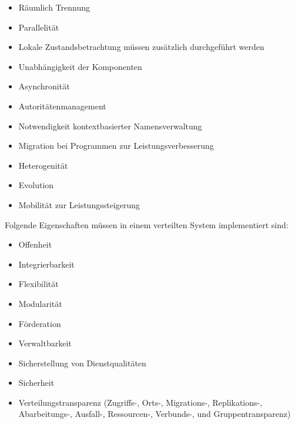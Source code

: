\documentclass{article}
\begin{document}
    \begin{itemize}
        \item Räumlich Trennung
        \item Parallelität 
        \item Lokale Zustandsbetrachtung müssen zusätzlich durchgeführt werden
        \item Unabhängigkeit der Komponenten
        \item Asynchronität
        \item Autoritätenmanagement
        \item Notwendigkeit kontextbasierter Namensverwaltung
        \item Migration bei Programmen zur Leistungsverbesserung
        \item Heterogenität
        \item Evolution
        \item Mobilität zur Leistungssteigerung
    \end{itemize}
    Folgende Eigenschaften müssen in einem verteilten System implementiert sind:
    \begin{itemize}
        \item Offenheit
        \item Integrierbarkeit
        \item Flexibilität
        \item Modularität
        \item Förderation
        \item Verwaltbarkeit
        \item Sicherstellung von Dienstqualitäten
        \item Sicherheit
        \item Verteilungstransparenz (Zugriffs-, Orts-, Migrations-, Replikations-, Abarbeitungs-, Ausfall-, Ressourcen-, Verbunds-, und Gruppentransparenz)
    \end{itemize}
\end{document}
